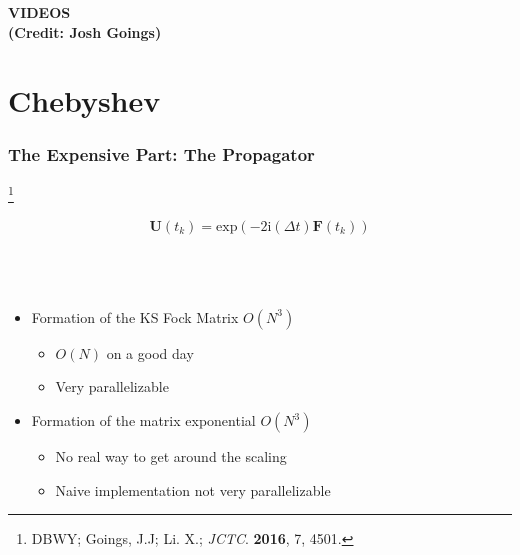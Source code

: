 \documentclass{beamer}
\newcommand{\bpar}[1]{\left( #1 \right)}                  %
\renewcommand{\exp}[1]{\mathrm{exp}\bpar{#1}}
\newcommand\blfootnote[1]{%
  \begingroup
  \renewcommand\thefootnote{}\footnote{#1}%
  \addtocounter{footnote}{-1}%
  \endgroup
}
\begin{document}
\begin{frame}
\centering \LARGE \bf VIDEOS\\
\Large (Credit: Josh Goings)
\end{frame}

\section{Chebyshev}

\begin{frame}
\frametitle{The Expensive Part: The Propagator}
\blfootnote{DBWY; Goings, J.J; Li. X.; \emph{JCTC}. \textbf{2016}, 7, 4501.}
{ \LARGE
\begin{equation*}
\mathbf{U}(t_k) = \exp{-2\mathrm{i}(\Delta t) \mathbf{F}(t_k)}
\end{equation*}
}
~\\
~\\
~\\


\begin{itemize}
  \item Formation of the KS Fock Matrix $O(N^3)$
  \begin{itemize}
    \normalsize
    \item $O(N)$ on a good day
    \item Very parallelizable
  \end{itemize}
  \item Formation of the matrix exponential $O(N^3)$
  \begin{itemize}
    \normalsize
    \item No real way to get around the scaling
    \item Naive implementation not very parallelizable
  \end{itemize}
\end{itemize}

\end{frame}
\end{document}
